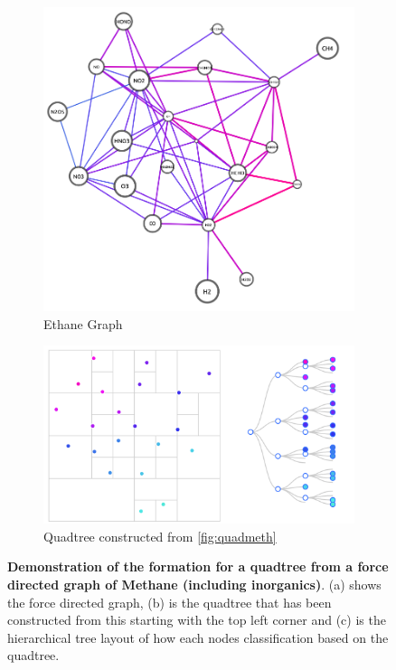\begin{figure}[H]
 \centering
    \begin{subfigure}[b]{.3\textwidth}
  \centering \includegraphics[width=\textwidth]{figures_c1/layout/methanequad.png}   
  \caption{Ethane Graph} 
  \label{fig:quadmeth}
 \end{subfigure}
 \begin{subfigure}[b]{.6\textwidth}
  \centering \includegraphics[width=\textwidth]{figures_c1/layout/quad.png}
 \caption{Quadtree constructed from \autoref{fig:quadmeth}}
\label{fig:quadtree}
\end{subfigure}
\caption{ \textbf{Demonstration of the formation for a quadtree from a force directed graph of Methane (including inorganics)}. (a) shows the force directed graph, (b) is the quadtree that has been constructed from this starting with the top left corner and (c) is the hierarchical tree layout of how each nodes classification based on the quadtree. }
\label{fig:quadgroup}
\end{figure}

